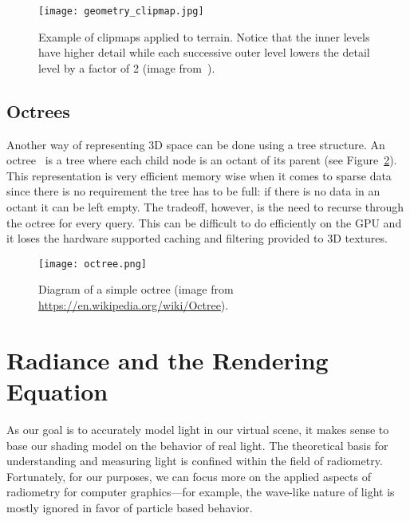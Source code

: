 \begin{figure}[h]
\centering
\texttt{[image: geometry\_clipmap.jpg]}
\caption{Example of clipmaps applied to terrain. Notice that the inner levels have higher detail while each successive outer level lowers the detail level by a factor of 2 (image from~\cite{Losasso:2004:GCT:1015706.1015799}).}
\label{fig:geometryclipmaps}
\end{figure}

\subsection{Octrees}
Another way of representing 3D space can be done using a tree structure. An octree~\cite{MEAGHER1982129} is a tree where each child node is an octant of its parent (see Figure~\ref{fig:octree}). This representation is very efficient memory wise when it comes to sparse data since there is no requirement the tree has to be full: if there is no data in an octant it can be left empty. The tradeoff, however, is the need to recurse through the octree for every query. This can be difficult to do efficiently on the GPU and it loses the hardware supported caching and filtering provided to 3D textures.

\begin{figure}[h]
\centering
\texttt{[image: octree.png]}
\caption{Diagram of a simple octree (image from \url{https://en.wikipedia.org/wiki/Octree}).}
\label{fig:octree}
\end{figure}

\section{Radiance and the Rendering Equation}
As our goal is to accurately model light in our virtual scene, it makes sense to base our shading model on the behavior of real light. The theoretical basis for understanding and measuring light is confined within the field of radiometry. Fortunately, for our purposes, we can focus more on the applied aspects of radiometry for computer graphics---for example, the wave-like nature of light is mostly ignored in favor of particle based behavior.

